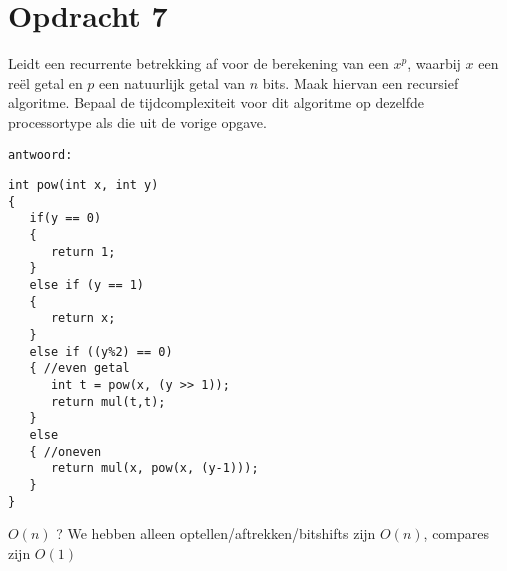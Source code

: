 \section{Opdracht 7}
Leidt een recurrente betrekking af voor de berekening van een $x^p$, waarbij  $x$ een re\"{e}l getal en $p$ een natuurlijk getal van $n$ bits. Maak hiervan een recursief algoritme. Bepaal de tijdcomplexiteit voor dit algoritme op dezelfde processortype als die uit de vorige opgave.

\texttt{antwoord:}

\begin{lstlisting}
int pow(int x, int y) 
{
   if(y == 0) 
   {
      return 1;
   } 
   else if (y == 1) 
   {
      return x;
   } 
   else if ((y%2) == 0) 
   { //even getal
      int t = pow(x, (y >> 1));
      return mul(t,t);
   } 
   else 
   { //oneven
      return mul(x, pow(x, (y-1)));
   }
}
\end{lstlisting}
$O(n)$ ? We hebben alleen optellen/aftrekken/bitshifts zijn $O(n)$, compares zijn $O(1)$
